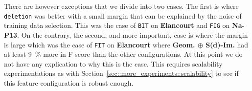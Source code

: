            There are however exceptions that we divide into two cases.
            The first is where \texttt{deletion} was better with a small margin that can be explained by the noise of training data selection.
            This was the case of \texttt{BIT} on \textbf{Elancourt} and \texttt{FIG} on \textbf{Na-P13}.
            On the contrary, the second, and more important, case is where the margin is large which was the case of \texttt{FIT} on \textbf{Elancourt} where \textbf{Geom. \(\oplus\) S(d)-Im.} had at least \SI{9}{\percent} more in F-score than the other configurations.
            At this point we do not have any explication to why this is the case.
            This requires scalability experimentations as with Section~\ref{sec::more_experiments::scalability} to see if this feature configuration is robust enough.\\

